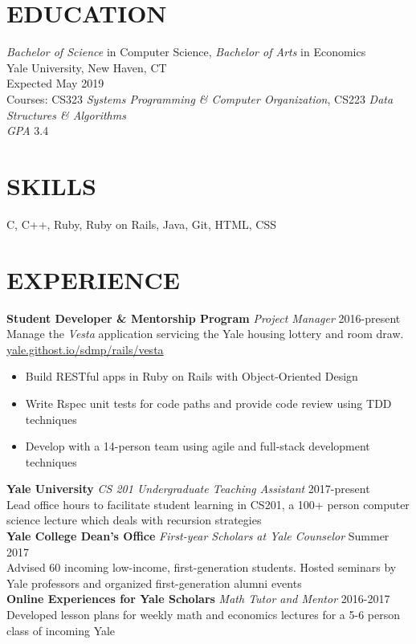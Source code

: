 \documentclass[margin, centered]{res}
\begin{document}
\address{\href{mailto:melina.delgado@yale.edu}{melina.delgado@yale.edu} | \href{http://melinadelgado.com}{melinadelgado.com} \\ 130 Prospect St, New Haven, CT 06511 | (954) 682-8999}

\begin{resume}
  \section{EDUCATION}
  \textit{Bachelor of Science} in Computer Science, \textit{Bachelor of Arts} in Economics \\
  Yale University, New Haven, CT \\
  Expected May 2019 \\
  Courses: CS323 \textit{Systems Programming \& Computer Organization}, CS223 \textit{Data Structures \& Algorithms} \\ 
  \textit{GPA} 3.4

  \section{SKILLS}
  C, C++, Ruby, Ruby on Rails, Java, Git, HTML, CSS
  

  \section{EXPERIENCE}
  \textbf{Student Developer \&  Mentorship Program} \textit{Project Manager} \hfill 2016-present \\
  Manage the \textit{Vesta} application servicing the Yale housing lottery and room draw. \\ 
  \href{https://yale.githost.io/sdmp/rails/vesta}{yale.githost.io/sdmp/rails/vesta}\smallskip{}
  \begin{itemize}
    \item Build RESTful apps in Ruby on Rails with Object-Oriented Design
    \item Write Rspec unit tests for code paths and provide code review using TDD techniques
    \item Develop with a 14-person team using agile and full-stack development techniques
  \end{itemize}
  \textbf{Yale University} \textit{CS 201 Undergraduate Teaching Assistant} \hfill 2017-present \\
  Lead office hours to facilitate student learning in CS201, a 100+ person computer science lecture which deals with recursion strategies \\ 
  \textbf{Yale College Dean's Office} \textit{First-year Scholars at Yale Counselor} \hfill Summer 2017 \\
  Advised 60 incoming low-income, first-generation students. Hosted seminars by Yale professors and organized first-generation alumni events \\
  \textbf{Online Experiences for Yale Scholars} \textit{Math Tutor and Mentor} \hfill 2016-2017 \\
  Developed lesson plans for weekly math and economics lectures for a 5-6 person class of incoming Yale 


\end{resume}
\end{document}
